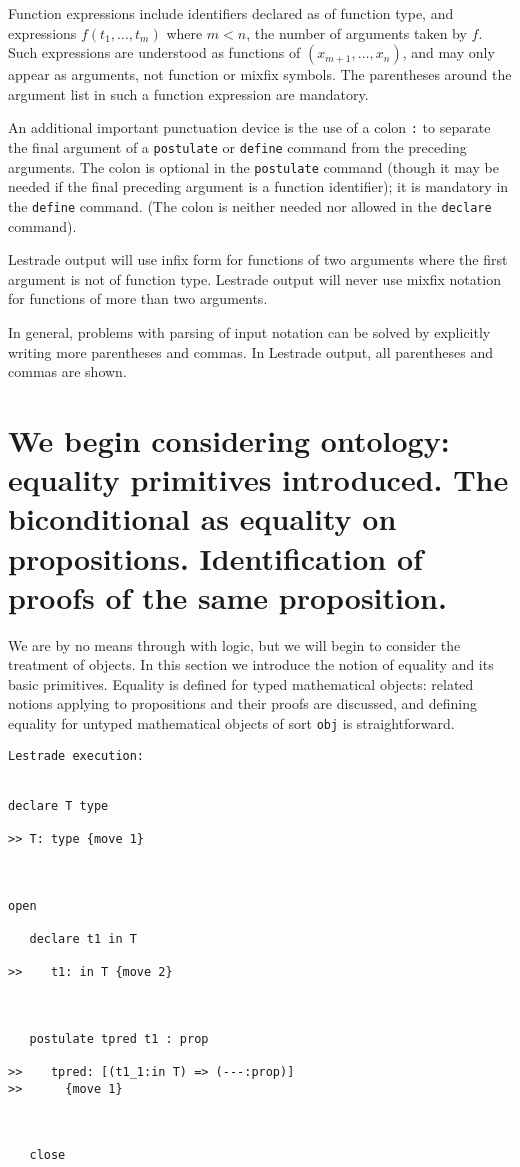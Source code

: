 \documentclass[12pt]{article}
\begin{document}
Function expressions include identifiers declared as of function type, and expressions $f(t_1,\ldots,t_m)$ where $m<n$, the number of arguments taken by $f$.  Such expressions are understood as functions of $(x_{m+1},\ldots,x_n)$, and may only appear as arguments, not function or mixfix symbols.  The parentheses around the argument list in such a function expression are mandatory.

An additional important punctuation device is the use of a colon {\tt :} to separate the final argument of a {\tt postulate} or {\tt define} command from the preceding arguments.  The colon is optional in the {\tt postulate} command (though it may be needed if the final preceding argument is a function identifier); it is mandatory in the {\tt define} command.  (The colon is neither needed nor allowed in the {\tt declare} command).

Lestrade output will use infix form for functions of two arguments where the first argument is not of function type.  Lestrade output will never use mixfix notation for functions of more than two arguments.

In general, problems with parsing of input notation can be solved by explicitly writing more parentheses and commas.  In Lestrade  output, all parentheses and commas are shown.

\section{We begin considering ontology:  equality primitives introduced.  The biconditional as equality on propositions.  Identification of proofs of the same proposition.}

We are by no means through with logic, but we will begin to consider the treatment of objects.  In this section we introduce the notion of equality and its basic primitives.  Equality is defined for typed mathematical objects:  related notions applying to propositions and their proofs are discussed, and defining equality for untyped mathematical objects of sort {\tt obj} is straightforward.

\begin{verbatim}Lestrade execution:


declare T type

>> T: type {move 1}



open

   declare t1 in T

>>    t1: in T {move 2}



   postulate tpred t1 : prop

>>    tpred: [(t1_1:in T) => (---:prop)]
>>      {move 1}



   close
\end{verbatim}
\end{document}
